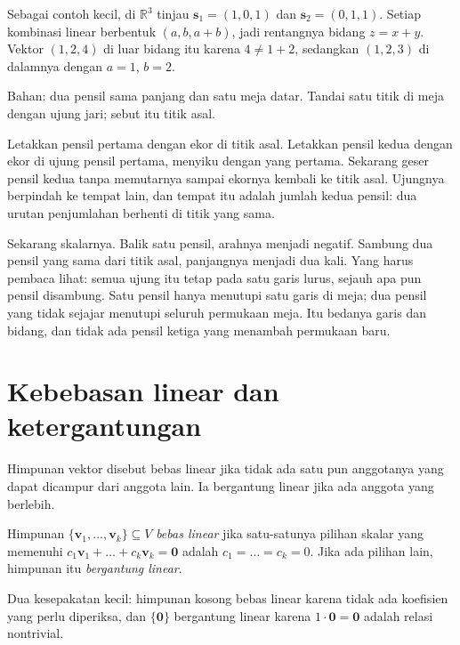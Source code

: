 Sebagai contoh kecil, di $\mathbb{R}^{3}$ tinjau $\mathbf{s}_{1}=(1,0,1)$ dan
$\mathbf{s}_{2}=(0,1,1)$. Setiap kombinasi linear berbentuk $(a,b,a+b)$, jadi rentangnya
bidang $z=x+y$. Vektor $(1,2,4)$ di luar bidang itu karena $4\neq 1+2$, sedangkan $(1,2,3)$
di dalamnya dengan $a=1$, $b=2$.

\begin{tangan}
Bahan: dua pensil sama panjang dan satu meja datar. Tandai satu titik di meja dengan ujung
jari; sebut itu titik asal.

Letakkan pensil pertama dengan ekor di titik asal. Letakkan pensil kedua dengan ekor di ujung
pensil pertama, menyiku dengan yang pertama. Sekarang geser pensil kedua tanpa memutarnya
sampai ekornya kembali ke titik asal. Ujungnya berpindah ke tempat lain, dan tempat itu adalah
jumlah kedua pensil: dua urutan penjumlahan berhenti di titik yang sama.

Sekarang skalarnya. Balik satu pensil, arahnya menjadi negatif. Sambung dua pensil yang sama
dari titik asal, panjangnya menjadi dua kali. Yang harus pembaca lihat: semua ujung itu tetap
pada satu garis lurus, sejauh apa pun pensil disambung. Satu pensil hanya menutupi satu garis
di meja; dua pensil yang tidak sejajar menutupi seluruh permukaan meja. Itu bedanya garis dan
bidang, dan tidak ada pensil ketiga yang menambah permukaan baru.
\end{tangan}



\section{Kebebasan linear dan ketergantungan}

Himpunan vektor disebut bebas linear jika tidak ada satu pun anggotanya yang dapat dicampur
dari anggota lain. Ia bergantung linear jika ada anggota yang berlebih.

\begin{definisi}
Himpunan $\{\mathbf{v}_{1},\dots,\mathbf{v}_{k}\}\subseteq V$ \emph{bebas linear} jika
satu-satunya pilihan skalar yang memenuhi
$c_{1}\mathbf{v}_{1}+\dots+c_{k}\mathbf{v}_{k}=\mathbf{0}$ adalah
$c_{1}=\dots=c_{k}=0$. Jika ada pilihan lain, himpunan itu \emph{bergantung linear}.
\end{definisi}

Dua kesepakatan kecil: himpunan kosong bebas linear karena tidak ada koefisien yang perlu
diperiksa, dan $\{\mathbf{0}\}$ bergantung linear karena $1\cdot\mathbf{0}=\mathbf{0}$
adalah relasi nontrivial.

